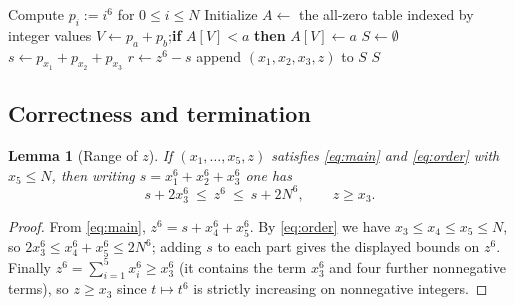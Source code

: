 \documentclass{amsart}
\newtheorem{lemma}{Lemma}
\begin{document}
\begin{algorithm}[h]
\caption{Exhaustive search for solutions of \eqref{eq:main} with $\max_i x_i\le N$}
\label{alg:search}
\begin{algorithmic}[1]
\State Compute $p_i:=i^6$ for $0\le i\le N$
\State Initialize $A\gets$ the all-zero table indexed by integer values
    \State $V\gets p_a+p_b$;\quad \textbf{if} $A[V]<a$ \textbf{then} $A[V]\gets a$
  \EndFor
\EndFor
\State $S\gets\emptyset$
      \State $s\gets p_{x_1}+p_{x_2}+p_{x_3}$
        \State $r\gets z^6-s$ 
          \State append $(x_1,x_2,x_3,z)$ to $S$
        \EndIf
      \EndFor
    \EndFor
  \EndFor
\EndFor
\State \Return $S$
\end{algorithmic}
\end{algorithm}

\subsection*{Correctness and termination}

\begin{lemma}[Range of $z$]\label{lem:zrange}
If $(x_1,\dots,x_5,z)$ satisfies \eqref{eq:main} and \eqref{eq:order}
with $x_5\le N$, then writing $s=x_1^6+x_2^6+x_3^6$ one has
\begin{equation}\label{eq:wrange}
s+2x_3^6\ \le\ z^6\ \le\ s+2N^6,\qquad z\ge x_3 .
\end{equation}
\end{lemma}

\begin{proof}
From \eqref{eq:main}, $z^6=s+x_4^6+x_5^6$. By \eqref{eq:order} we have
$x_3\le x_4\le x_5\le N$, so $2x_3^6\le x_4^6+x_5^6\le 2N^6$; adding
$s$ to each part gives the displayed bounds on $z^6$. Finally
$z^6=\sum_{i=1}^5 x_i^6\ge x_3^6$ (it contains the term $x_3^6$ and
four further nonnegative terms), so $z\ge x_3$ since $t\mapsto t^6$ is
strictly increasing on nonnegative integers.
\end{proof}
\end{document}
